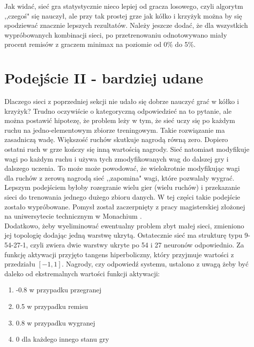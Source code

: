 \documentclass[licencjacka]{pracamgr}
\begin{document}
Jak widać, sieć gra statystycznie nieco lepiej od gracza losowego, czyli algorytm ,,czegoś" się nauczył, ale przy tak prostej grze jak kółko i krzyżyk można by się spodziewać znacznie lepszych rezultatów. Należy jeszcze dodać, że dla wszystkich wypróbowanych kombinacji sieci, po przetrenowaniu odnotowywano miały procent remisów z graczem minimax na poziomie od 0\% do 5\%.


\section{Podejście II - bardziej udane}

Dlaczego sieci z poprzedniej sekcji nie udało się dobrze nauczyć grać w kółko i krzyżyk? Trudno oczywiście o kategoryczną odpowiedzieć na to pytanie, ale można postawić hipotezę, że problem leży w tym, że sieć uczy się po każdym ruchu na jedno-elementowym zbiorze treningowym. Takie rozwiązanie ma zasadniczą wadę. Większość ruchów skutkuje nagrodą równą zero. Dopiero ostatni ruch w grze kończy się inną wartością nagrody. Sieć natomiast modyfikuje wagi po każdym ruchu i używa tych zmodyfikowanych wag do dalszej gry i dalszego uczenia.  To może może powodować, że wielokrotnie modyfikując wagi dla ruchów z zerową nagrodą sieć ,,zapomina" wagi, które pozwalały wygrać. Lepszym podejściem byłoby rozegranie wielu gier (wielu ruchów) i przekazanie sieci do trenowania jednego dużego zbioru danych. W tej części takie podejście zostało wypróbowane. Pomysł został zaczerpnięty z pracy magisterskiej złożonej na uniwersytecie technicznym w Monachium \cite{TUM}.\\

Dodatkowo, żeby wyeliminować ewentualny problem zbyt małej sieci, zmieniono jej topologię dodając jedną warstwę ukrytą. Ostatecznie sieć ma strukturę typu 9-54-27-1, czyli zwiera dwie warstwy ukryte po 54 i 27 neuronów odpowiednio.  Za funkcję aktywacji przyjęto tangens hiperboliczny, który przyjmuje wartości z przedziału $[-1,1]$. Nagrody, czy odpowiedź systemu, ustalono z uwagą żeby być daleko od ekstremalnych wartości funkcji aktywacji:

\begin{enumerate}
	\item{-0.8 w przypadku przegranej}
	\item{0.5 w przypadku remisu }
	\item{0.8 w przypadku wygranej}
	\item{0 dla każdego innego stanu gry}
\end{enumerate}
\end{document}
